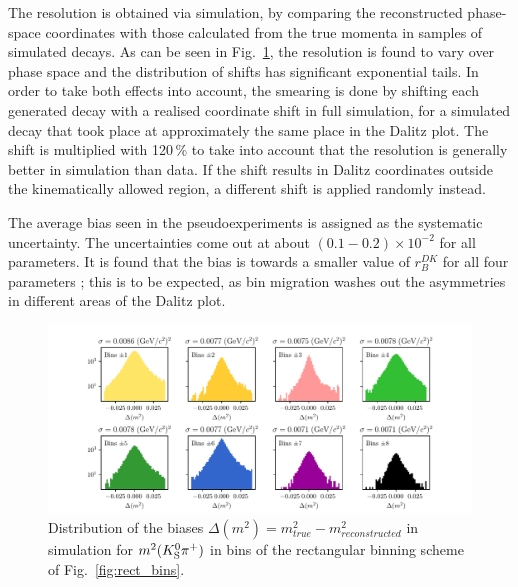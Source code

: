 
The resolution is obtained via simulation, by comparing the reconstructed phase-space coordinates with those calculated from the true momenta in samples of simulated \DtoKspipi decays. As can be seen in Fig.~\ref{fig:dalitz_coord_resolution_and_correlation}, the resolution is found to vary over phase space and the distribution of shifts has significant exponential tails. In order to take both effects into account, the smearing is done by shifting each generated decay with a realised coordinate shift in full simulation, for a simulated decay that took place at approximately the same place in the Dalitz plot. The shift is multiplied with 120\,\% to take into account that the resolution is generally better in simulation than data. If the shift results in Dalitz coordinates outside the kinematically allowed region, a different shift is applied randomly instead.

The average bias seen in the pseudoexperiments is assigned as the systematic uncertainty. The uncertainties come out at about $(0.1-0.2)\times 10^{-2}$ for all parameters. It is found that the bias is towards a smaller value of $r_B^{DK}$ for all four \DK parameters ; this is to be expected, as bin migration washes out the asymmetries in different areas of the Dalitz plot. 

\begin{figure}[tb]
    \centering
    \includegraphics[width=\columnwidth]{figures/analysis/systematics/Dalitz_resolution_rect_bins.pdf}
    \caption{Distribution of the biases $\Delta (m^2) = m^2_{true} - m^2_{reconstructed}$ in simulation for $m^2({{K}^0_{\mathrm{S}}} {{\pi}^+})$ in bins of the rectangular binning scheme of Fig.~\ref{fig:rect_bins}.}
    \label{fig:dalitz_coord_resolution_and_correlation}
\end{figure}



